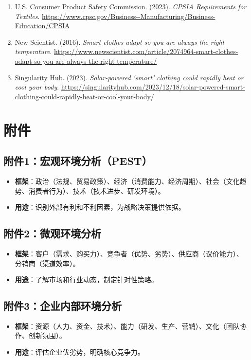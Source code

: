 \documentclass[UTF8]{report}
\theoremstyle{MyLineTheoremStyle} %
\theoremstyle{MyBlockTheoremStyle} %
\theoremstyle{MySubsubsectionStyle} %
\begin{document}
\begin{enumerate}
    \item U.S. Consumer Product Safety Commission. (2023). \textit{CPSIA Requirements for Textiles}. \url{https://www.cpsc.gov/Business--Manufacturing/Business-Education/CPSIA}
    \item New Scientist. (2016). \textit{Smart clothes adapt so you are always the right temperature}. \url{https://www.newscientist.com/article/2074964-smart-clothes-adapt-so-you-are-always-the-right-temperature/}
    \item Singularity Hub. (2023). \textit{Solar-powered ‘smart’ clothing could rapidly heat or cool your body}. \url{https://singularityhub.com/2023/12/18/solar-powered-smart-clothing-could-rapidly-heat-or-cool-your-body/}
\end{enumerate}

\chapter{附件}
\section{附件1：宏观环境分析（PEST）}
\begin{itemize}
    \item \textbf{框架}：政治（法规、贸易政策）、经济（消费能力、经济周期）、社会（文化趋势、消费者行为）、技术（技术进步、研发环境）。
    \item \textbf{用途}：识别外部有利和不利因素，为战略决策提供依据。
\end{itemize}

\section{附件2：微观环境分析}
\begin{itemize}
    \item \textbf{框架}：客户（需求、购买力）、竞争者（优势、劣势）、供应商（议价能力）、分销商（渠道效率）。
    \item \textbf{用途}：了解市场和行业动态，制定针对性策略。
\end{itemize}

\section{附件3：企业内部环境分析}
\begin{itemize}
    \item \textbf{框架}：资源（人力、资金、技术）、能力（研发、生产、营销）、文化（团队协作、创新氛围）。
    \item \textbf{用途}：评估企业优劣势，明确核心竞争力。
\end{itemize}
\end{document}

